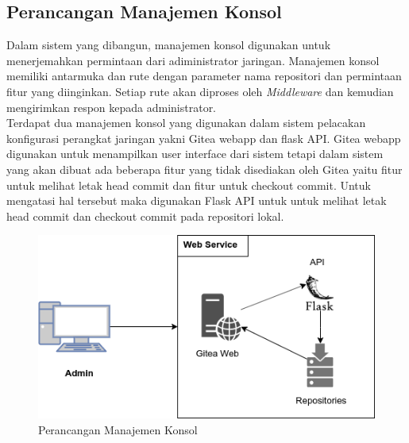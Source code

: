         
        \subsection{Perancangan Manajemen Konsol}
        	Dalam sistem yang dibangun, manajemen konsol digunakan untuk menerjemahkan permintaan dari adiministrator jaringan. Manajemen konsol memiliki antarmuka dan rute dengan parameter nama repositori dan permintaan fitur yang diinginkan. Setiap rute akan diproses oleh \textit{Middleware} dan kemudian mengirimkan respon kepada administrator.\\
        	\indent Terdapat dua manajemen konsol yang digunakan dalam sistem pelacakan konfigurasi perangkat jaringan yakni Gitea webapp dan flask API. Gitea webapp digunakan untuk menampilkan user interface dari sistem tetapi dalam sistem yang akan dibuat ada beberapa fitur yang tidak disediakan oleh Gitea yaitu fitur untuk melihat letak head commit dan fitur untuk checkout commit. Untuk mengatasi hal tersebut maka digunakan Flask API untuk untuk melihat letak head commit dan checkout commit pada repositori lokal.  
         	\begin{figure}[H]
         		\centering
         		\includegraphics[width=\textwidth]{Images/C-3/Web_Service.png}
         		\caption{Perancangan Manajemen Konsol}
         		\label{ManajemenKonsol}
         	\end{figure}
        
       
            
        